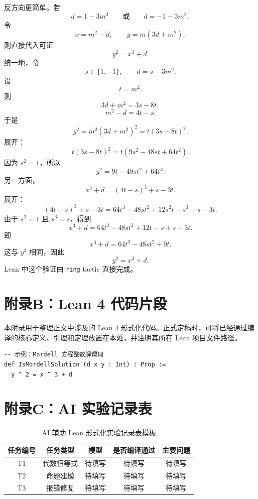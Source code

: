 反方向更简单。若
\[
d=1-3m^2
\qquad\text{或}\qquad
d=-1-3m^2,
\]
令
\[
x=m^2-d,\qquad y=m(3d+m^2),
\]
则直接代入可证
\[
y^2=x^3+d.
\]
统一地，令
\[
s\in\{1,-1\},\qquad d=s-3m^2.
\]
设
\[
t=m^2.
\]
则
\[
3d+m^2=3s-8t,
\]
\[
m^2-d=4t-s.
\]
于是
\[
y^2=m^2(3d+m^2)^2=t(3s-8t)^2.
\]
展开：
\[
t(3s-8t)^2=t(9s^2-48st+64t^2).
\]
因为 \(s^2=1\)，所以
\[
y^2=9t-48st^2+64t^3.
\]
另一方面，
\[
x^3+d=(4t-s)^3+s-3t.
\]
展开：
\[
(4t-s)^3+s-3t
=64t^3-48st^2+12s^2t-s^3+s-3t.
\]
由于 \(s^2=1\) 且 \(s^3=s\)，得到
\[
x^3+d=64t^3-48st^2+12t-s+s-3t.
\]
即
\[
x^3+d=64t^3-48st^2+9t.
\]
这与 \(y^2\) 相同，因此
\[
y^2=x^3+d.
\]
Lean 中这个验证由 \texttt{ring} tactic 直接完成。

\newpage
{}
\section*{附录B：Lean 4 代码片段}

本附录用于整理正文中涉及的 Lean 4 形式化代码。正式定稿时，可将已经通过编译的核心定义、引理和定理放置在本处，并注明其所在 Lean 项目文件路径。

\begin{verbatim}
-- 示例：Mordell 方程整数解谓词
def IsMordellSolution (d x y : Int) : Prop :=
  y ^ 2 = x ^ 3 + d
\end{verbatim}

\newpage
{}
\section*{附录C：AI 实验记录表}

\begin{table}[htbp]
\centering
\caption*{AI 辅助 Lean 形式化实验记录表模板}
\small
\begin{tabular}{ccccc}
\toprule
任务编号 & 任务类型 & 模型 & 是否编译通过 & 主要问题\\
\midrule
T1 & 代数恒等式 & 待填写 & 待填写 & 待填写\\
T2 & 命题建模 & 待填写 & 待填写 & 待填写\\
T3 & 报错修复 & 待填写 & 待填写 & 待填写\\
\bottomrule
\end{tabular}
\end{table}
